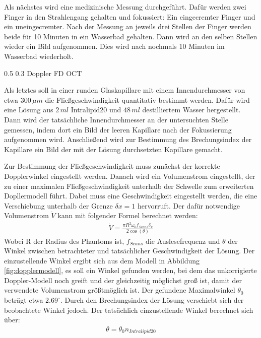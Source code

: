 \documentclass[german, %
parskip=full, %
bibliography=totoc, %
]{scrartcl}
\makeatletter
\renewcommand\subsection{\@startsection 
   {subsection}{2}{0mm}%
   {0.5\baselineskip}%
   {0.3\baselineskip}%
   {\bfseries\sffamily\large}%
   }
\makeatother
\begin{document}
Als nächstes wird eine medizinische Messung durchgeführt. Dafür werden zwei Finger in den Strahlengang gehalten und fokussiert: Ein eingecremter Finger und ein uneingecremter. Nach der Messung an jeweils drei Stellen der Finger werden beide für 10 Minuten in ein Wasserbad gehalten. Dann wird an den selben Stellen wieder ein Bild aufgenommen. Dies wird nach nochmals 10 Minuten im Wasserbad wiederholt.

\subsection{Doppler FD OCT}

Als letztes soll in einer runden Glaskapillare mit einem Innendurchmesser von etwa $300\, \mu m$ die Fließgeschwindigkeit quantitativ bestimmt werden. Dafür wird eine Lösung aus $2\,ml$ Intralipid20 und $48\,ml$ destilliertem Wasser hergestellt. Dann wird der tatsächliche Innendurchmesser an der untersuchten Stelle gemessen, indem dort ein Bild der leeren Kapillare nach der Fokussierung aufgenommen wird. Anschließend wird zur Bestimmung des Brechungsindex der Kapillare ein Bild der mit der Lösung durchsetzten Kapillare gemacht. 

Zur Bestimmung der Fließgeschwindigkeit muss zunächst der korrekte Dopplerwinkel eingestellt werden. Danach wird ein Volumenstrom eingestellt, der zu einer maximalen Fließgeschwindigkeit unterhalb der Schwelle zum erweiterten Dopllermodell führt. 
Dabei muss eine Geschwindigkeit eingestellt werden, die eine Verschiebung unterhalb der Grenze $\delta x = 1$ hervorruft. Der dafür notwendige Volumenstrom $\dot V$ kann mit folgender Formel berechnet werden: 
\begin{align}
\dot V = \frac{\pi R^2 \omega_0 f_{Scans} \delta_x}{2 \cos (\theta)}
\end{align}
Wobei R der Radius des Phantoms ist, $f_{Scans}$ die Auslesefrequenz und $\theta$ der Winkel zwischen betrachteter und tatsächlicher Geschwindigkeit der Lösung. Der einzustellende Winkel ergibt sich aus dem Modell in Abbildung \ref{fig:dopplermodell}, es soll ein Winkel gefunden werden, bei dem das unkorrigierte Doppler-Modell noch greift und der gleichzeitig möglichst groß ist, damit der verwendete Volumenstrom größtmöglich ist. Der gefundene Maximalwinkel $\theta_0$ beträgt etwa $2.69^\circ$. Durch den Brechungsindex der Lösung verschiebt sich der beobachtete Winkel jedoch. Der tatsächlich einzustellende Winkel berechnet sich über:
\begin{align}
\theta = \theta_0 n_{Intralipid20}
\end{align}
\end{document}
